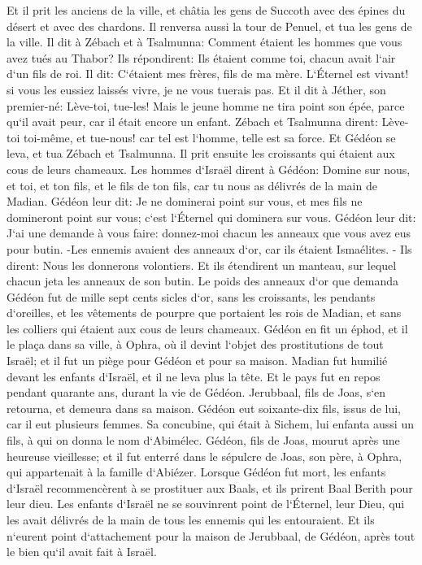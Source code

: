 \verse Et il prit les anciens de la ville, et châtia les gens de Succoth avec des épines du désert et avec des chardons. 
\verse Il renversa aussi la tour de Penuel, et tua les gens de la ville. 
\verse Il dit à Zébach et à Tsalmunna: Comment étaient les hommes que vous avez tués au Thabor? Ils répondirent: Ils étaient comme toi, chacun avait l`air d`un fils de roi. 
\verse Il dit: C`étaient mes frères, fils de ma mère. L`Éternel est vivant! si vous les eussiez laissés vivre, je ne vous tuerais pas. 
\verse Et il dit à Jéther, son premier-né: Lève-toi, tue-les! Mais le jeune homme ne tira point son épée, parce qu`il avait peur, car il était encore un enfant. 
\verse Zébach et Tsalmunna dirent: Lève-toi toi-même, et tue-nous! car tel est l`homme, telle est sa force. Et Gédéon se leva, et tua Zébach et Tsalmunna. Il prit ensuite les croissants qui étaient aux cous de leurs chameaux. 
\verse Les hommes d`Israël dirent à Gédéon: Domine sur nous, et toi, et ton fils, et le fils de ton fils, car tu nous as délivrés de la main de Madian. 
\verse Gédéon leur dit: Je ne dominerai point sur vous, et mes fils ne domineront point sur vous; c`est l`Éternel qui dominera sur vous. 
\verse Gédéon leur dit: J`ai une demande à vous faire: donnez-moi chacun les anneaux que vous avez eus pour butin. -Les ennemis avaient des anneaux d`or, car ils étaient Ismaélites. - 
\verse Ils dirent: Nous les donnerons volontiers. Et ils étendirent un manteau, sur lequel chacun jeta les anneaux de son butin. 
\verse Le poids des anneaux d`or que demanda Gédéon fut de mille sept cents sicles d`or, sans les croissants, les pendants d`oreilles, et les vêtements de pourpre que portaient les rois de Madian, et sans les colliers qui étaient aux cous de leurs chameaux. 
\verse Gédéon en fit un éphod, et il le plaça dans sa ville, à Ophra, où il devint l`objet des prostitutions de tout Israël; et il fut un piège pour Gédéon et pour sa maison. 
\verse Madian fut humilié devant les enfants d`Israël, et il ne leva plus la tête. Et le pays fut en repos pendant quarante ans, durant la vie de Gédéon. 
\verse Jerubbaal, fils de Joas, s`en retourna, et demeura dans sa maison. 
\verse Gédéon eut soixante-dix fils, issus de lui, car il eut plusieurs femmes. 
\verse Sa concubine, qui était à Sichem, lui enfanta aussi un fils, à qui on donna le nom d`Abimélec. 
\verse Gédéon, fils de Joas, mourut après une heureuse vieillesse; et il fut enterré dans le sépulcre de Joas, son père, à Ophra, qui appartenait à la famille d`Abiézer. 
\verse Lorsque Gédéon fut mort, les enfants d`Israël recommencèrent à se prostituer aux Baals, et ils prirent Baal Berith pour leur dieu. 
\verse Les enfants d`Israël ne se souvinrent point de l`Éternel, leur Dieu, qui les avait délivrés de la main de tous les ennemis qui les entouraient. 
\verse Et ils n`eurent point d`attachement pour la maison de Jerubbaal, de Gédéon, après tout le bien qu`il avait fait à Israël. 

